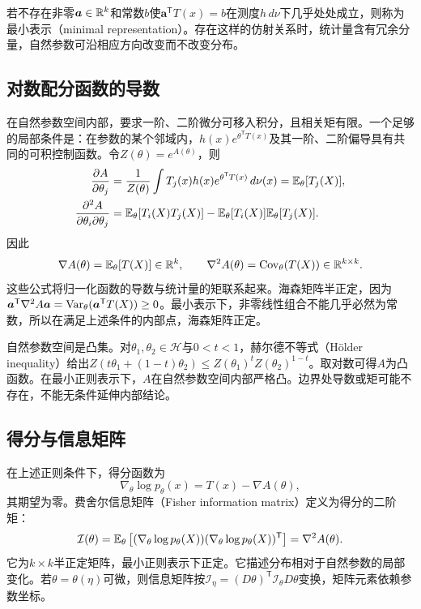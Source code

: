 若不存在非零$\bm a\in\mathbb{R}^k$和常数$b$使$\bm a^{\mathsf T}T(x)=b$在测度$h\,d\nu$下几乎处处成立，则称为最小表示（minimal representation）。存在这样的仿射关系时，统计量含有冗余分量，自然参数可沿相应方向改变而不改变分布。

\subsection{对数配分函数的导数}
在自然参数空间内部，要求一阶、二阶微分可移入积分，且相关矩有限。一个足够的局部条件是：在参数的某个邻域内，$h(x)e^{\theta^{\mathsf T}T(x)}$及其一阶、二阶偏导具有共同的可积控制函数。令$Z(\theta)=e^{A(\theta)}$，则
\begin{align}
 \frac{\partial A}{\partial\theta_j}
 &=\frac1{Z(\theta)}\int T_j(x)h(x)e^{\theta^{\mathsf T}T(x)}\,d\nu(x)
 =\mathbb{E}_\theta[T_j(X)],\\
 \frac{\partial^2A}{\partial\theta_i\partial\theta_j}
 &=\mathbb{E}_\theta[T_i(X)T_j(X)]-\mathbb{E}_\theta[T_i(X)]\mathbb{E}_\theta[T_j(X)].
\end{align}
因此
\begin{equation}
 \nabla A(\theta)=\mathbb{E}_\theta[T(X)]\in\mathbb{R}^k,\qquad
 \nabla^2A(\theta)=\operatorname{Cov}_\theta(T(X))\in\mathbb{R}^{k\times k}.
 \label{eq:math-log-partition-derivatives}
\end{equation}
这些公式将归一化函数的导数与统计量的矩联系起来。海森矩阵半正定，因为$\bm a^{\mathsf T}\nabla^2A\bm a=\operatorname{Var}_\theta(\bm a^{\mathsf T}T(X))\geq0$。最小表示下，非零线性组合不能几乎必然为常数，所以在满足上述条件的内部点，海森矩阵正定。

自然参数空间是凸集。对$\theta_1,\theta_2\in\mathcal H$与$0<t<1$，赫尔德不等式（Hölder inequality）给出$Z(t\theta_1+(1-t)\theta_2)\leq Z(\theta_1)^tZ(\theta_2)^{1-t}$。取对数可得$A$为凸函数。在最小正则表示下，$A$在自然参数空间内部严格凸。边界处导数或矩可能不存在，不能无条件延伸内部结论。

\subsection{得分与信息矩阵}
在上述正则条件下，得分函数为
\begin{equation}
 \nabla_\theta\log p_\theta(x)=T(x)-\nabla A(\theta),
\end{equation}
其期望为零。费舍尔信息矩阵（Fisher information matrix）定义为得分的二阶矩：
\begin{equation}
 \mathcal I(\theta)=\mathbb{E}_\theta\left[
 (\nabla_\theta\log p_\theta(X))(\nabla_\theta\log p_\theta(X))^{\mathsf T}\right]
 =\nabla^2A(\theta).
\end{equation}
它为$k\times k$半正定矩阵，最小正则表示下正定。它描述分布相对于自然参数的局部变化。若$\theta=\theta(\eta)$可微，则信息矩阵按$\mathcal I_\eta=(D\theta)^{\mathsf T}\mathcal I_\theta D\theta$变换，矩阵元素依赖参数坐标。

